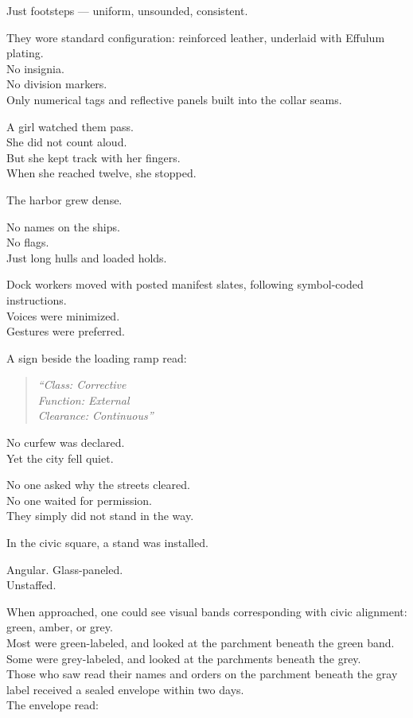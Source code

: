 \documentclass[9pt]{article}
\begin{document}
Just footsteps — uniform, unsounded, consistent.

They wore standard configuration: reinforced leather, underlaid with Effulum plating.\\
No insignia.\\
No division markers.\\
Only numerical tags and reflective panels built into the collar seams.

\vspace{1em}

A girl watched them pass.\\
She did not count aloud.\\
But she kept track with her fingers.\\
When she reached twelve, she stopped.

\vspace{1em}

The harbor grew dense.

No names on the ships.\\
No flags.\\
Just long hulls and loaded holds.

Dock workers moved with posted manifest slates, following symbol-coded instructions.\\
Voices were minimized.\\
Gestures were preferred.

A sign beside the loading ramp read:

\begin{quote}
\textit{“Class: Corrective\\
Function: External\\
Clearance: Continuous”}
\end{quote}

\vspace{1em}

No curfew was declared.\\
Yet the city fell quiet.

No one asked why the streets cleared.\\
No one waited for permission.\\
They simply did not stand in the way.

\vspace{1em}

In the civic square, a stand was installed.

Angular. Glass-paneled.\\
Unstaffed.

When approached, one could see visual bands corresponding with civic alignment: green, amber, or grey.\\
Most were green-labeled, and looked at the parchment beneath the green band.\\
Some were grey-labeled, and looked at the parchments beneath the grey.\\
Those who saw read their names and orders on the parchment beneath the gray label received a sealed envelope within two days.\\
The envelope read:
\end{document}
